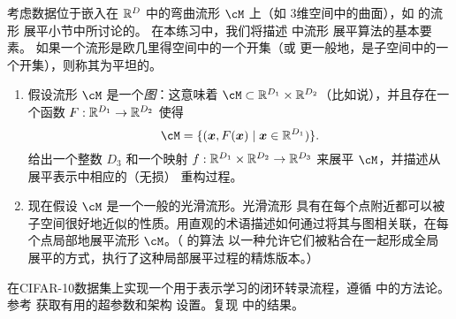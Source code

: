 \documentclass[../../book-main_zh.tex]{subfiles}
\begin{document}
\begin{exercise}[流形展平的概念理解]
  考虑数据位于嵌入在 $\mathbb{R}^D$ 中的弯曲流形 $\cM$ 上（如
  3维空间中的曲面），如  的流形
  展平小节中所讨论的。
  在本练习中，我们将描述 \cite{Psenka-JMLR24} 中流形
  展平算法的基本要素。
  如果一个流形是欧几里得空间中的一个开集（或
  更一般地，是子空间中的一个开集），则称其为平坦的。

  \begin{enumerate}
    \item 假设流形 $\cM$ 是一个\textit{图}：这意味着 $\cM
      \subset \R^{D_1} \times \R^{D_2}$（比如说），并且存在一个函数 $F
      : \mathbb{R}^{D_1} \to \mathbb{R}^{D_2}$ 使得
      \begin{equation}
        \cM = \set{(\x, F(\x) \mid \x \in \R^{D_1})}.
      \end{equation}
      给出一个整数 $D_3$ 和一个映射 $f : \mathbb{R}^{D_1} \times \mathbb{R}^{D_2} \to \mathbb{R}^{D_3}$
      来展平 $\cM$，并描述从展平表示中相应的（无损）
      重构过程。
    \item 现在假设 $\cM$ 是一个一般的光滑流形。光滑流形
      具有在每个点附近都可以被子空间很好地近似的性质。用直观的术语描述如何通过将其与图相关联，在每个点局部地展平流形
      $\cM$。（\cite{Psenka-JMLR24} 的算法
      以一种允许它们被粘合在一起形成全局
      展平的方式，执行了这种局部展平过程的精炼版本。）
  \end{enumerate}
\end{exercise}


\begin{exercise}[复现闭环转录]

  在CIFAR-10数据集上实现一个用于表示学习的闭环转录流程，遵循
   中的方法论。
  参考 \cite{Dai-entropy-2022} 获取有用的超参数和架构
  设置。复现  中的结果。


\end{exercise}
\end{document}
